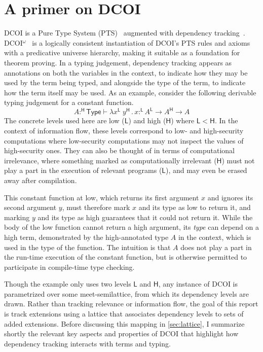 \documentclass{article}
\newcommand{\kw}[1]{\mathsf{#1}}
\newcommand{\HH}{\mathsf{H}}
\newcommand{\LL}{\mathsf{L}}
\begin{document}
\section{A primer on DCOI} \label{sec:dcoi}

DCOI is a Pure Type System (PTS)~\citep{pts} augmented with dependency tracking~\cite{dcc}.
DCOI$^\omega$~\citep{dcoi-omega} is a logically consistent instantiation
of DCOI's PTS rules and axioms with a predicative universe hierarchy,
making it suitable as a foundation for theorem proving.
In a typing judgement, dependency tracking appears as annotations
on both the variables in the context,
to indicate how they may be used by the term being typed,
and alongside the type of the term,
to indicate how the term itself may be used.
As an example, consider the following derivable typing judgement for a constant function.
$$A :^\HH \kw{Type} \vdash \lambda x^\LL \; y^\HH \mathpunct{.} x :^\LL
  A^\LL \to A^\HH \to A$$
The concrete levels used here are low ($\LL$) and high ($\HH$) where $\LL < \HH$.
In the context of information flow,
these levels correspond to low- and high-security computations
where low-security computations may not inspect the values of high-security ones.
They can also be thought of in terms of computational irrelevance,
where something marked as computationally irrelevant ($\HH$)
must not play a part in the execution of relevant programs ($\LL$),
and may even be erased away after compilation.

This constant function at low,
which returns its first argument $x$ and ignores its second argument $y$,
must therefore mark $x$ and its type as low to return it,
and marking $y$ and its type as high guarantees that it could not return it.
While the body of the low function cannot return a high argument,
its \emph{type} can depend on a high term,
demonstrated by the high-annotated type $A$ in the context,
which is used in the type of the function.
The intuition is that $A$ does not play a part in the run-time execution of the constant function,
but is otherwise permitted to participate in compile-time type checking.

Though the example only uses two levels $\LL$ and $\HH$,
any instance of DCOI is parametrized over some meet-semilattice,
from which its dependency levels are drawn.
Rather than tracking relevance or information flow,
the goal of this report is track extensions
using a lattice that associates dependency levels to sets of added extensions.
Before discussing this mapping in \cref{sec:lattice},
I summarize shortly the relevant key aspects and properties of DCOI
that highlight how dependency tracking interacts with terms and typing.
\end{document}

